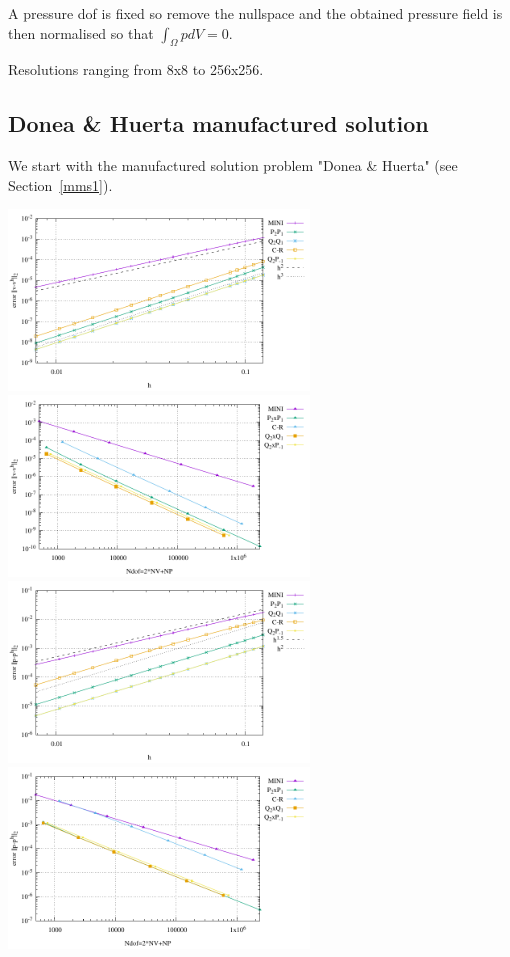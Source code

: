 A pressure dof is fixed so remove the nullspace and the obtained pressure field
is then normalised so that $\int_\Omega p dV = 0$.

Resolutions ranging from 8x8 to 256x256.  

\newpage
\subsection*{Donea \& Huerta manufactured solution}

We start with the manufactured solution problem "Donea \& Huerta" (see Section~\ref{mms1}).

\begin{center}
\includegraphics[width=8cm]{python_codes/fieldstone_112/results/exp1/errors_V.pdf}
\includegraphics[width=8cm]{python_codes/fieldstone_112/results/exp1/errors_V_ndof.pdf}\\
\includegraphics[width=8cm]{python_codes/fieldstone_112/results/exp1/errors_P.pdf}
\includegraphics[width=8cm]{python_codes/fieldstone_112/results/exp1/errors_P_ndof.pdf}\\

\end{center}
